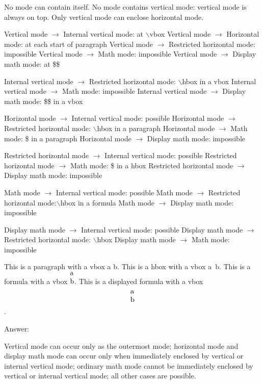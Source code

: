 \def\\{$\backslash$}
\obeylines

\smallskip
No mode can contain itself.
No mode contains vertical mode: vertical mode is always on top.
Only vertical mode can enclose horizontal mode.


\smallskip
Vertical mode $\rightarrow$ Internal vertical mode: at \\vbox
Vertical mode $\rightarrow$ Horizontal mode: at each start of paragraph
Vertical mode $\rightarrow$ Restricted horizontal mode: impossible
Vertical mode $\rightarrow$ Math mode: impossible
Vertical mode $\rightarrow$ Display math mode: at \$\$

\smallskip
Internal vertical mode $\rightarrow$ Restricted horizontal mode: \\hbox in a vbox
Internal vertical mode $\rightarrow$ Math mode: impossible
Internal vertical mode $\rightarrow$ Display math mode: \$\$ in a vbox

\smallskip
Horizontal mode $\rightarrow$ Internal vertical mode: possible
Horizontal mode $\rightarrow$ Restricted horizontal mode: \\hbox in a paragraph
Horizontal mode $\rightarrow$ Math mode: \$ in a paragraph
Horizontal mode $\rightarrow$ Display math mode: impossible

\smallskip
Restricted horizontal mode $\rightarrow$ Internal vertical mode: possible
Restricted horizontal mode $\rightarrow$ Math mode: \$ in a hbox
Restricted horizontal mode $\rightarrow$ Display math mode: impossible

\smallskip
Math mode $\rightarrow$ Internal vertical mode: possible
Math mode $\rightarrow$ Restricted horizontal mode:\\hbox in a formula
Math mode $\rightarrow$ Display math mode: impossible


\smallskip
Display math mode $\rightarrow$  Internal vertical mode: possible
Display math mode $\rightarrow$ Restricted horizontal mode: \\hbox
Display math mode $\rightarrow$ Math mode: impossible

\smallskip
This is a paragraph with a vbox \vbox{\hbox{a} \hbox{b}}.
This is a hbox with a vbox \hbox{\vbox{\hbox{a} \hbox{b}}}.
This is a formula with a vbox $\vbox{\hbox{a} \hbox{b}}$.
This is a displayed formula with a vbox $$\vbox{\hbox{a} \hbox{b}}$$.

Answer:

Vertical mode can occur only as the outermost mode; horizontal mode and
display math mode can occur only when immediately enclosed by vertical or internal
vertical mode; ordinary math mode cannot be immediately enclosed by vertical or
internal vertical mode; all other cases are possible.

\bye

